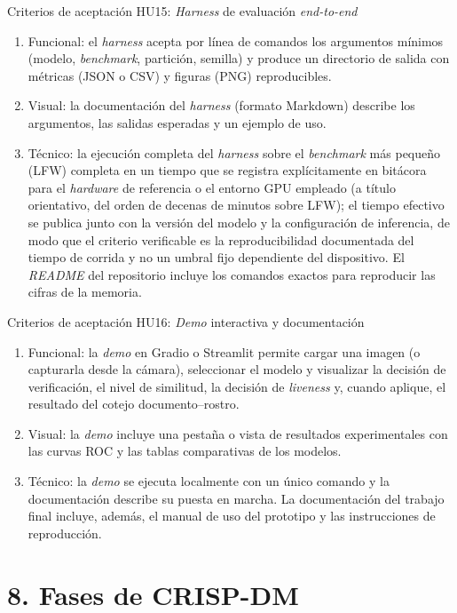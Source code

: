 \documentclass[
  11pt, %
]{charter}
\begin{document}
Criterios de aceptación HU15: \textit{Harness} de evaluación \textit{end-to-end}
\begin{enumerate}
  \item Funcional: el \textit{harness} acepta por línea de comandos los argumentos mínimos (modelo, \textit{benchmark}, partición, semilla) y produce un directorio de salida con métricas (JSON o CSV) y figuras (PNG) reproducibles.
  \item Visual: la documentación del \textit{harness} (formato Markdown) describe los argumentos, las salidas esperadas y un ejemplo de uso.
  \item Técnico: la ejecución completa del \textit{harness} sobre el \textit{benchmark} más pequeño (LFW) completa en un tiempo que se registra explícitamente en bitácora para el \textit{hardware} de referencia o el entorno GPU empleado (a título orientativo, del orden de decenas de minutos sobre LFW); el tiempo efectivo se publica junto con la versión del modelo y la configuración de inferencia, de modo que el criterio verificable es la reproducibilidad documentada del tiempo de corrida y no un umbral fijo dependiente del dispositivo. El \textit{README} del repositorio incluye los comandos exactos para reproducir las cifras de la memoria.
\end{enumerate}

Criterios de aceptación HU16: \textit{Demo} interactiva y documentación
\begin{enumerate}
  \item Funcional: la \textit{demo} en Gradio o Streamlit permite cargar una imagen (o capturarla desde la cámara), seleccionar el modelo y visualizar la decisión de verificación, el nivel de similitud, la decisión de \textit{liveness} y, cuando aplique, el resultado del cotejo documento--rostro.
  \item Visual: la \textit{demo} incluye una pestaña o vista de resultados experimentales con las curvas ROC y las tablas comparativas de los modelos.
  \item Técnico: la \textit{demo} se ejecuta localmente con un único comando y la documentación describe su puesta en marcha. La documentación del trabajo final incluye, además, el manual de uso del prototipo y las instrucciones de reproducción.
\end{enumerate}

\section{8. Fases de CRISP-DM}
\label{sec:crispdm}
\end{document}
